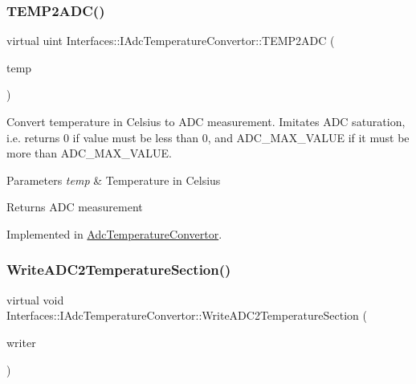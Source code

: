 \subsubsection{\texorpdfstring{T\+E\+M\+P2\+A\+D\+C()}{TEMP2ADC()}}
{\footnotesize\ttfamily virtual uint Interfaces\+::\+I\+Adc\+Temperature\+Convertor\+::\+T\+E\+M\+P2\+A\+DC (\begin{DoxyParamCaption}\item[{double}]{temp }\end{DoxyParamCaption})\hspace{0.3cm}{\ttfamily [pure virtual]}}



Convert temperature in Celsius to A\+DC measurement. Imitates A\+DC saturation, i.\+e. returns 0 if value must be less than 0, and A\+D\+C\+\_\+\+M\+A\+X\+\_\+\+V\+A\+L\+UE if it must be more than A\+D\+C\+\_\+\+M\+A\+X\+\_\+\+V\+A\+L\+UE. 


\begin{DoxyParams}{Parameters}
{\em temp} & Temperature in Celsius \\
\hline
\end{DoxyParams}
\begin{DoxyReturn}{Returns}
A\+DC measurement 
\end{DoxyReturn}


Implemented in \hyperlink{class_adc_temperature_convertor_ae82f374826a431c837bdf796c593775b}{Adc\+Temperature\+Convertor}.

\mbox{\label{class_interfaces_1_1_i_adc_temperature_convertor_abc7ed5fdfeaed255af14930431b46ac1}} 
\subsubsection{\texorpdfstring{Write\+A\+D\+C2\+Temperature\+Section()}{WriteADC2TemperatureSection()}}
{\footnotesize\ttfamily virtual void Interfaces\+::\+I\+Adc\+Temperature\+Convertor\+::\+Write\+A\+D\+C2\+Temperature\+Section (\begin{DoxyParamCaption}\item[{Q\+Xml\+Stream\+Writer $\ast$}]{writer }\end{DoxyParamCaption})\hspace{0.3cm}{\ttfamily [pure virtual]}}



